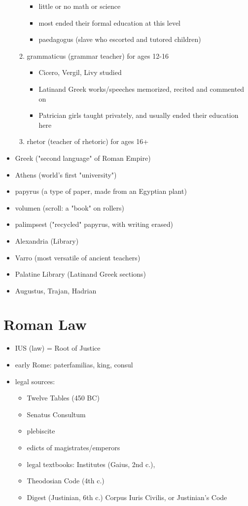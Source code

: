 \documentclass[12pt, twoside]{article}
\begin{document}
\begin{itemize}
\begin{enumerate}
\begin{itemize}
		\item little or no math or science
		\item most ended their formal education at this level
		\item paedagogus (slave who escorted and tutored children)
		\end{itemize}
	\item grammaticus (grammar teacher) for ages 12-16
		\begin{itemize}
		\item Cicero, Vergil, Livy studied
		\item Latinand Greek works/speeches memorized, recited and commented on 
		\item Patrician girls taught privately, and usually ended their education here
		\end{itemize}
	\item rhetor (teacher of rhetoric) for ages 16+
	\end{enumerate}
\item Greek ("second language" of Roman Empire)
\item Athens (world's first "university")
\item papyrus (a type of paper, made from an Egyptian plant)
\item volumen (scroll: a "book" on rollers)
\item palimpsest ("recycled" papyrus, with writing erased)
\item Alexandria (Library)
\item Varro (most versatile of ancient teachers)
\item Palatine Library (Latinand Greek sections)
\item Augustus, Trajan, Hadrian
\end{itemize}

\section{Roman Law}
\begin{itemize}
\item IUS (law) = Root of Justice
\item early Rome: paterfamilias, king, consul
\item legal sources:
	\begin{itemize}
	\item Twelve Tables (450 BC)
	\item Senatus Consultum
	\item plebiscite
	\item edicts of magistrates/emperors
	\item legal textbooks: Institutes (Gaius, 2nd c.),
	\item Theodosian Code (4th c.)
	\item Digest (Justinian, 6th c.) Corpus Iuris Civilis, or Justinian’s Code 
	\end{itemize}
\end{itemize}
\end{document}
